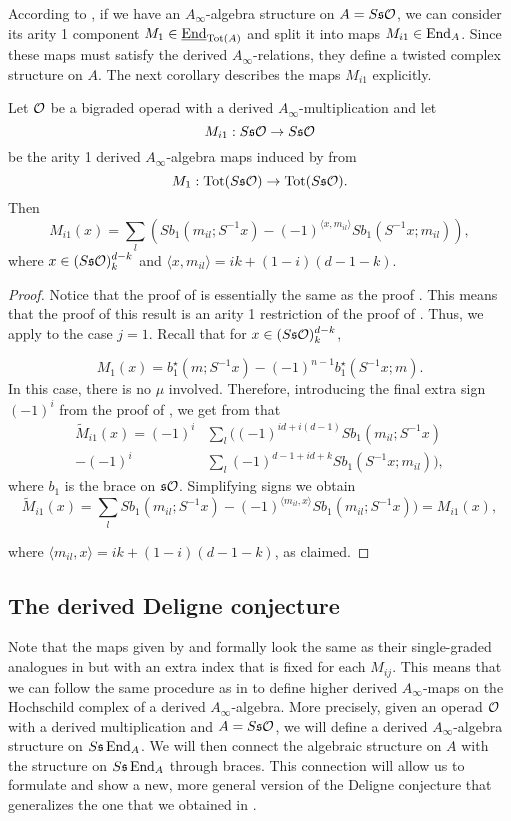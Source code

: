 \documentclass[Thesis.tex]{subfiles}
\begin{document}
According to , if we have an $A_\infty$-algebra structure on $A = S\mathfrak{s}{\mathcal O}$, we can consider its arity 1 component $M_1\in\underline{\operatorname{End}}_{\operatorname{Tot}(A)}$ and split it into maps $M_{i1}\in \operatorname{End}_A$. Since these maps must satisfy the derived $A_\infty$-relations, they define a twisted complex structure on $A$. The next corollary describes the maps $M_{i1}$ explicitly.
\pagebreak
\begin{corollary}\label{mi1}
Let ${\mathcal O}$ be a bigraded operad with a derived $A_\infty$-multiplication and let \[M_{i1}:S\mathfrak{s}{\mathcal O}\to S\mathfrak{s}{\mathcal O}\] be the arity 1 derived $A_\infty$-algebra maps induced by  from \[M_1:\operatorname{Tot}(S\mathfrak{s}{\mathcal O})\to \operatorname{Tot}(S\mathfrak{s}{\mathcal O}).\]
Then \[M_{i1}(x)= \sum_l (Sb_1(m_{il};S^{-1}x)-(-1)^{\langle x,m_{il}\rangle}Sb_1(S^{-1}x;m_{il})),\]
where $x\in (S\mathfrak{s}{\mathcal O})^{d-k}_k$ and $\langle x,m_{il}\rangle=ik+(1-i)(d-1-k)$.
\end{corollary}
\begin{proof}
Notice that the proof of  is essentially the same as the proof . This means that the proof of this result is an arity 1 restriction of the proof of . Thus, we apply  to the case $j=1$. Recall that for $x\in (S\mathfrak{s}{\mathcal O})^{d-k}_{k}$,

\[M_1(x)=b_1^\star(m;S^{-1}x)-(-1)^{n-1}b_1^\star(S^{-1}x;m).\]
 In this case, there is no $\mu$ involved. Therefore, introducing the final extra sign $(-1)^i$ from the proof of , we get from  that
\begin{align*}
\widetilde{M}_{i1}(x)=(-1)^i&\sum_l((-1)^{id+i(d-1)} Sb_1(m_{il};S^{-1}x)\\
-(-1)^i&\sum_l(-1)^{d-1+id+k}Sb_1(S^{-1}x;m_{il})),
\end{align*} where $b_1$ is the brace on $\mathfrak{s}{\mathcal O}$. Simplifying signs we obtain
\[\widetilde{M}_{i1}(x)=\sum_l Sb_1(m_{il};S^{-1}x)-(-1)^{\langle  m_{il},x\rangle}Sb_1(m_{il};S^{-1}x))=M_{i1}(x),\]

where $\langle  m_{il},x\rangle=ik+(1-i)(d-1-k)$, as claimed.
\end{proof}

\subsection{The derived Deligne conjecture}


Note that the maps given by  and  formally look the same as their single-graded analogues in  but with an extra index that is fixed for each $M_{ij}$. This means that we can follow the same procedure as in  to define higher derived $A_\infty$-maps on the Hochschild complex of a derived $A_\infty$-algebra. More precisely, given an operad ${\mathcal O}$ with a derived multiplication and $A=S\mathfrak{s}{\mathcal O}$, we will define a derived $A_\infty$-algebra structure on $S\mathfrak{s}\operatorname{End}_A$. We will then connect the algebraic structure on $A$ with the structure on $S\mathfrak{s}\operatorname{End}_A$ through braces. This connection will allow us to formulate and show a new, more general version of the Deligne conjecture that generalizes the one that we obtained in . 
\end{document}
